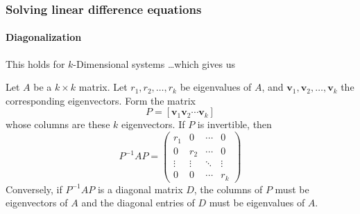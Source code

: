 \documentclass[10pt, handout]{beamer}
\begin{document}
\begin{frame}
\frametitle{Solving linear difference equations}
\framesubtitle{Diagonalization} 

This holds for $k$-Dimensional systems \ldots which gives us %

\begin{theorem}[23.4]\label{th23.4}
Let $A$ be a $k \times k$ matrix. Let $r_1, r_2, \ldots, r_k$ be eigenvalues of $A$, and $\mathbf{v}_1, \mathbf{v}_2, \ldots, \mathbf{v}_k$ the corresponding eigenvectors. Form the matrix $$P = [ \mathbf{v}_1 \mathbf{v}_2 \cdots \mathbf{v}_k ] $$ whose columns are these $k$ eigenvectors. If $P$ is invertible, then 
\begin{equation}\label{diagonalisation}
P^{-1}A{P} = \begin{pmatrix}
r_1 & 0 & \cdots & 0 \\
0 & r_2 & \cdots & 0 \\
\vdots & \vdots & \ddots & \vdots \\
0 & 0 & \cdots & r_k
\end{pmatrix}
\end{equation}
Conversely, if $P^{-1}A{P}$ is a diagonal matrix $D$, the columns of $P$ must be eigenvectors of $A$ and the diagonal entries of $D$ must be eigenvalues of $A$.
\end{theorem}


\end{frame}
\end{document}
